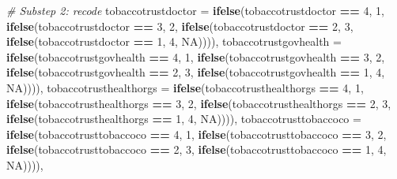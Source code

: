 \documentclass[
]{article}
\newenvironment{Shaded}{\begin{snugshade}}{\end{snugshade}}
\newcommand{\AttributeTok}[1]{\textcolor[rgb]{0.13,0.29,0.53}{#1}}
\newcommand{\CommentTok}[1]{\textcolor[rgb]{0.56,0.35,0.01}{\textit{#1}}}
\newcommand{\ConstantTok}[1]{\textcolor[rgb]{0.56,0.35,0.01}{#1}}
\newcommand{\DecValTok}[1]{\textcolor[rgb]{0.00,0.00,0.81}{#1}}
\newcommand{\FunctionTok}[1]{\textcolor[rgb]{0.13,0.29,0.53}{\textbf{#1}}}
\newcommand{\NormalTok}[1]{#1}
\newcommand{\SpecialCharTok}[1]{\textcolor[rgb]{0.81,0.36,0.00}{\textbf{#1}}}
\begin{document}
\begin{Shaded}
\begin{Highlighting}[]
    \CommentTok{\# Substep 2: recode}
    \AttributeTok{tobaccotrustdoctor =} \FunctionTok{ifelse}\NormalTok{(tobaccotrustdoctor }\SpecialCharTok{==} \DecValTok{4}\NormalTok{, }\DecValTok{1}\NormalTok{,}
                                \FunctionTok{ifelse}\NormalTok{(tobaccotrustdoctor }\SpecialCharTok{==} \DecValTok{3}\NormalTok{, }\DecValTok{2}\NormalTok{,}
                                       \FunctionTok{ifelse}\NormalTok{(tobaccotrustdoctor }\SpecialCharTok{==} \DecValTok{2}\NormalTok{, }\DecValTok{3}\NormalTok{,}
                                              \FunctionTok{ifelse}\NormalTok{(tobaccotrustdoctor }\SpecialCharTok{==} \DecValTok{1}\NormalTok{, }\DecValTok{4}\NormalTok{, }\ConstantTok{NA}\NormalTok{)))),}
    \AttributeTok{tobaccotrustgovhealth =} \FunctionTok{ifelse}\NormalTok{(tobaccotrustgovhealth }\SpecialCharTok{==} \DecValTok{4}\NormalTok{, }\DecValTok{1}\NormalTok{,}
                                   \FunctionTok{ifelse}\NormalTok{(tobaccotrustgovhealth }\SpecialCharTok{==} \DecValTok{3}\NormalTok{, }\DecValTok{2}\NormalTok{,}
                                          \FunctionTok{ifelse}\NormalTok{(tobaccotrustgovhealth }\SpecialCharTok{==} \DecValTok{2}\NormalTok{, }\DecValTok{3}\NormalTok{,}
                                                 \FunctionTok{ifelse}\NormalTok{(tobaccotrustgovhealth }\SpecialCharTok{==} \DecValTok{1}\NormalTok{, }\DecValTok{4}\NormalTok{, }\ConstantTok{NA}\NormalTok{)))),}
    \AttributeTok{tobaccotrusthealthorgs =} \FunctionTok{ifelse}\NormalTok{(tobaccotrusthealthorgs }\SpecialCharTok{==} \DecValTok{4}\NormalTok{, }\DecValTok{1}\NormalTok{,}
                                     \FunctionTok{ifelse}\NormalTok{(tobaccotrusthealthorgs }\SpecialCharTok{==} \DecValTok{3}\NormalTok{, }\DecValTok{2}\NormalTok{,}
                                            \FunctionTok{ifelse}\NormalTok{(tobaccotrusthealthorgs }\SpecialCharTok{==} \DecValTok{2}\NormalTok{, }\DecValTok{3}\NormalTok{,}
                                                   \FunctionTok{ifelse}\NormalTok{(tobaccotrusthealthorgs }\SpecialCharTok{==} \DecValTok{1}\NormalTok{, }\DecValTok{4}\NormalTok{, }\ConstantTok{NA}\NormalTok{)))),}
    \AttributeTok{tobaccotrusttobaccoco =} \FunctionTok{ifelse}\NormalTok{(tobaccotrusttobaccoco }\SpecialCharTok{==} \DecValTok{4}\NormalTok{, }\DecValTok{1}\NormalTok{,}
                                    \FunctionTok{ifelse}\NormalTok{(tobaccotrusttobaccoco }\SpecialCharTok{==} \DecValTok{3}\NormalTok{, }\DecValTok{2}\NormalTok{,}
                                           \FunctionTok{ifelse}\NormalTok{(tobaccotrusttobaccoco }\SpecialCharTok{==} \DecValTok{2}\NormalTok{, }\DecValTok{3}\NormalTok{,}
                                                  \FunctionTok{ifelse}\NormalTok{(tobaccotrusttobaccoco }\SpecialCharTok{==} \DecValTok{1}\NormalTok{, }\DecValTok{4}\NormalTok{, }\ConstantTok{NA}\NormalTok{)))),}
    

\end{Highlighting}
\end{Shaded}
\end{document}
